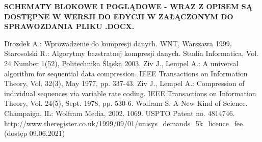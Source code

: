 \documentclass{article}
\begin{document}
\textbf{SCHEMATY BLOKOWE I POGLĄDOWE - WRAZ Z OPISEM SĄ DOSTĘPNE W WERSJI DO EDYCJI W ZAŁĄCZONYM DO SPRAWOZDANIA PLIKU .DOCX.}

\begin{thebibliography}{9}
Drozdek A.: Wprowadzenie do kompresji danych. WNT, Warszawa 1999.
Starosolski R.: Algorytmy bezstratnej kompresji danych. Studia Informatica, Vol. 24 Number 1(52), Politechnika Śląska 2003.
Ziv J., Lempel A.: A universal algorithm for sequential data compression. IEEE Transactions on Information Theory, Vol. 32(3), May 1977, pp. 337-43.  
Ziv  J.,  Lempel  A.: Compression of individual sequences via variable rate coding. IEEE Transactions on Information Theory, Vol. 24(5), Sept. 1978, pp. 530-6.
Wolfram S. A New Kind of Science. Champaign, IL: Wolfram Media, 2002. 1069.
USPTO Patent no. 4814746. \newline \url{http://www.theregister.co.uk/1999/09/01/unisys_demands_5k_licence_fee} \newline(dostęp 09.06.2021)
\end{thebibliography}
\end{document}
